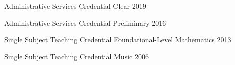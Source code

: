 

\begin{cvhonors}

  \cvhonor
    {Administrative Services Credential} %
    {Clear} %
    {} %
    {2019} %


  \cvhonor
    {Administrative Services Credential} %
    {Preliminary} %
    {} %
    {2016} %


  \cvhonor
    {Single Subject Teaching Credential} %
    {Foundational-Level Mathematics} %
    {} %
    {2013} %


  \cvhonor
    {Single Subject Teaching Credential} %
    {Music} %
    {} %
    {2006} %


\end{cvhonors}
